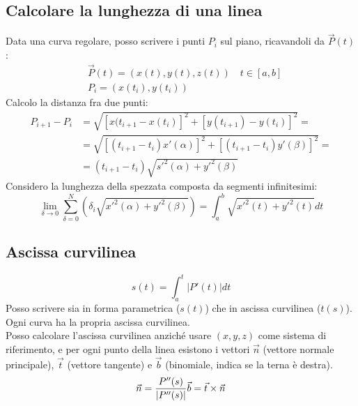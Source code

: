 \documentclass[10pt,a4paper,fleqn]{article}
\begin{document}
	\subsection{Calcolare la lunghezza di una linea}

	Data una curva regolare, posso scrivere i punti $P_i$ sul piano, ricavandoli da $\vec{P}(t)$:
	\begin{equation}
	\begin{aligned}
	&\vec{P}(t) = (x(t),y(t),z(t))\quad t \in [a,b]\\
	&P_i=(x(t_i),y(t_i))
	\end{aligned}
	\end{equation}
	Calcolo la distanza fra due punti:
	\begin{equation}
	\begin{aligned}
	P_{i+1} - P_i &= \sqrt{[x(t_{i+1}-x(t_i)]^2+[y(t_{i+1})-y(t_i)]^2}=\\
	&=\sqrt{[(t_{i+1}-t_i)x'(\alpha)]^2+[(t_{i+1}-t_i)y'(\beta)]^2}=\\
	&=(t_{i+1}-t_i)\sqrt{s'^2(\alpha)+y'^2(\beta)}
	\end{aligned}
	\end{equation}
	Considero la lunghezza della spezzata composta da segmenti infinitesimi:
	\begin{equation}
	\lim_{\delta\to 0}\sum^N_{\delta=0}\left( \delta_i\sqrt{x'^2(\alpha)+y'^2(\beta)} \right)=\int_a^b\sqrt{x'^2(t)+y'^2(t)}dt
	\end{equation}

	\subsection{Ascissa curvilinea}

	\begin{equation}
	s(t)=\int_a^t\left| P'(t)\right| dt
	\end{equation}
	Posso scrivere sia in forma parametrica ($s(t)$) che in ascissa curvilinea ($t(s)$).
	Ogni curva ha la propria ascissa curvilinea.\\
	Posso calcolare l'ascissa curvilinea anziché usare $(x,y,z)$ come sistema di riferimento, e per ogni punto della linea esistono i vettori $\vec{n}$ (vettore normale principale), $\vec{t}$ (vettore tangente) e $\vec{b}$ (binomiale, indica se la terna è destra).
	\begin{equation}
	\vec{n}=\frac{P''(s)}{|P''(s)|}\\ \vec{b}=\vec{t}\times\vec{n}
	\end{equation}
\end{document}
